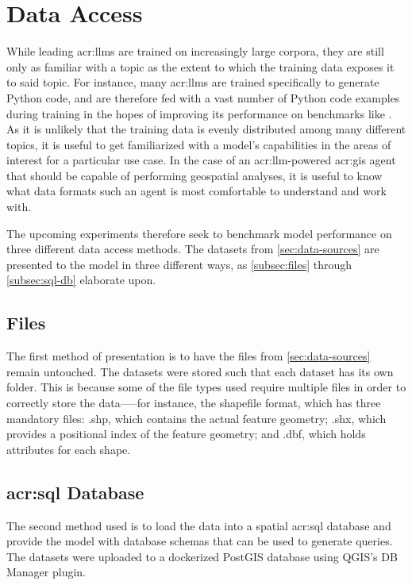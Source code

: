 \section{Data Access}
\label{sec:data-access}

While leading \glspl{acr:llm} are trained on increasingly large corpora, they are still only as familiar with a topic as the extent to which the training data exposes it to said topic. For instance, many \glspl{acr:llm} are trained specifically to generate Python code, and are therefore fed with a vast number of Python code examples during training in the hopes of improving its performance on benchmarks like . As it is unlikely that the training data is evenly distributed among many different topics, it is useful to get familiarized with a model's capabilities in the areas of interest for a particular use case. In the case of an \acrshort{acr:llm}-powered \acrshort{acr:gis} agent that should be capable of performing geospatial analyses, it is useful to know what data formats such an agent is most comfortable to understand and work with.

The upcoming experiments therefore seek to benchmark model performance on three different data access methods. The datasets from \autoref{sec:data-sources} are presented to the model in three different ways, as \autoref{subsec:files} through \autoref{subsec:sql-db} elaborate upon.

\subsection{Files}
\label{subsec:files}

The first method of presentation is to have the files from \autoref{sec:data-sources} remain untouched. The datasets were stored such that each dataset has its own folder. This is because some of the file types used require multiple files in order to correctly store the data—--for instance, the shapefile format, which has three mandatory files: .shp, which contains the actual feature geometry; .shx, which provides a positional index of the feature geometry; and .dbf, which holds attributes for each shape.

\subsection[SQL Database]{\acrshort{acr:sql} Database}
\label{subsec:sql-db}

The second method used is to load the data into a spatial \acrshort{acr:sql} database and provide the model with database schemas that can be used to generate queries. The datasets were uploaded to a dockerized PostGIS database using QGIS's DB Manager plugin.

